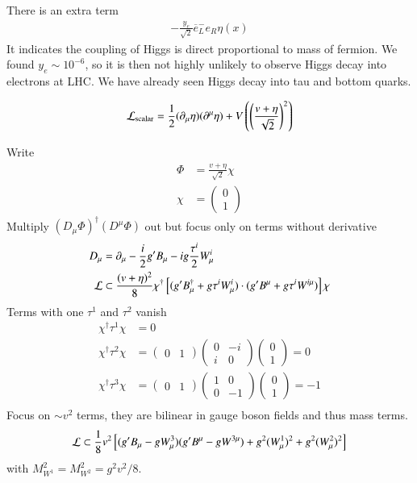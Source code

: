 There is an extra term
\begin{align*}
   - \frac{y_e}{\sqrt{2}} \overline{e}_L^- e_R \eta(x)
\end{align*}
It indicates the coupling of Higgs is direct proportional to mass of fermion. We found $y_e \sim 10^{-6}$, so it is then not highly unlikely to observe Higgs decay into electrons at LHC. We have already seen Higgs decay into tau and bottom quarks.

\begin{align}
   \mathcal{L}_\text{scalar} = \frac{1}{2} (\partial_\mu \eta) (\partial^\mu \eta) + V \left(\left(\frac{v+\eta}{\sqrt{2}}\right)^2 \right)
\end{align} 

Write 
\begin{align*}
   \Phi &= \frac{v + \eta}{\sqrt{2}} \chi \\ 
   \chi &= \begin{pmatrix} 0 \\ 1\end{pmatrix}
\end{align*}
Multiply $(D_\mu \Phi)^\dagger (D^\mu \Phi)$ out but focus only on terms without derivative
\begin{align*}
   D_\mu &= \partial_\mu - \frac{i}{2} g' B_\mu - ig \frac{\tau^i}{2} W_\mu^i \\
   \mathcal{L}  &\subset \frac{(v+\eta)^2}{8} \chi^\dagger \left[ (g'B_\mu^\dagger + g \tau^i W^i _\mu) \cdot (g' B^\mu + g \tau^i W^{i \mu})\right] \chi
\end{align*}
Terms with one $\tau^1$ and $\tau^2$ vanish
\begin{align*}
   \chi^\dagger \tau^1 \chi &= 0\\
   \chi^\dagger \tau^2 \chi &= \begin{pmatrix} 0 & 1\end{pmatrix} \begin{pmatrix} 0 & -i \\ i & 0 \end{pmatrix} \begin{pmatrix} 0 \\ 1 \end{pmatrix} = 0 \\
   \chi^\dagger \tau^3 \chi &= \begin{pmatrix} 0 & 1\end{pmatrix} \begin{pmatrix} 1 & 0 \\ 0 & -1 \end{pmatrix} \begin{pmatrix} 0 \\ 1\end{pmatrix} = -1 \\
\end{align*}
Focus on $\sim v^2$ terms, they are bilinear in gauge boson fields and thus mass terms.
\begin{align}
   \mathcal{L} \subset \frac{1}{8} v^2 \left[ (g'B_\mu - g W^3_\mu) (g' B^\mu-gW^{3 \mu}) + g^2 (W_\mu^1)^2 + g^2 (W_\mu^2)^2 \right]
\end{align}
with $M^2_{W^1} = M^2_{W^2} = {g^2 v^2}/ {8}$.

